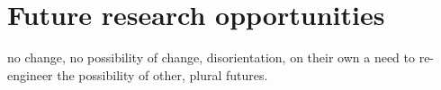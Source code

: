 


\section{Future research opportunities}



	no change, no possibility of change, disorientation, on their own
	a need to re-engineer the possibility of other, plural futures.